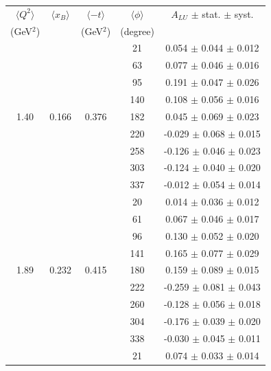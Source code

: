 \documentclass{article}
\begin{document}
\begin{table}[!h]
   \begin{center}
      \begin{tabular}{|c|c|c|c|c|}
         \hline
 $\langle Q^{2} \rangle$ & $\langle x_{B} \rangle$ & $\langle -t \rangle$ & $\langle \phi \rangle$ & $A_{LU}$ $\pm$ stat. $\pm$ syst.\\
 (GeV$^{2}$) &           & (GeV$^{2}$) & (degree) &  \\
 \hline 
        &       &        &   21   &   0.054  $\pm$  0.044   $\pm$ 0.012  \\
        &       &        &   63   &   0.077  $\pm$  0.046   $\pm$ 0.016  \\
        &       &        &   95   &   0.191  $\pm$  0.047   $\pm$ 0.026  \\
        &       &        &  140   &   0.108  $\pm$  0.056   $\pm$ 0.016  \\
  1.40  & 0.166 & 0.376  &  182   &   0.045  $\pm$  0.069   $\pm$ 0.023  \\
        &       &        &  220   &  -0.029  $\pm$  0.068   $\pm$ 0.015  \\
        &       &        &  258   &  -0.126  $\pm$  0.046   $\pm$ 0.023  \\
        &       &        &  303   &  -0.124  $\pm$  0.040   $\pm$ 0.020  \\
        &       &        &  337   &  -0.012  $\pm$  0.054   $\pm$ 0.014  \\
  \hline 
        &       &        &   20   &   0.014  $\pm$  0.036   $\pm$ 0.012  \\
        &       &        &   61   &   0.067  $\pm$  0.046   $\pm$ 0.017  \\
        &       &        &   96   &   0.130  $\pm$  0.052   $\pm$ 0.020  \\
        &       &        &  141   &   0.165  $\pm$  0.077   $\pm$ 0.029  \\
  1.89  & 0.232 & 0.415  &  180   &   0.159  $\pm$  0.089   $\pm$ 0.015  \\
        &       &        &  222   &  -0.259  $\pm$  0.081   $\pm$ 0.043  \\
        &       &        &  260   &  -0.128  $\pm$  0.056   $\pm$ 0.018  \\
        &       &        &  304   &  -0.176  $\pm$  0.039   $\pm$ 0.020  \\
        &       &        &  338   &  -0.030  $\pm$  0.045   $\pm$ 0.011  \\
  \hline 
        &       &        &   21   &   0.074  $\pm$  0.033   $\pm$ 0.014  \\

\end{tabular}
\end{center}
\end{table}
\end{document}
